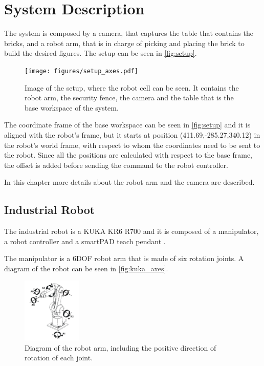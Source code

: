 \chapter{System Description}\label{chap:systemDescription}
The system is composed by a camera, that captures the table that contains the bricks, and a robot arm, that is in charge of picking and placing the brick to build the desired figures. The setup can be seen in \autoref{fig:setup}.
\begin{figure}[H]
    \texttt{[image: figures/setup\_axes.pdf]}
    \caption{Image of the setup, where the robot cell can be seen. It contains the robot arm, the security fence, the camera and the table that is the base workspace of the system. }
    \label{fig:setup}
\end{figure}

The coordinate frame of the base workspace can be seen in \autoref{fig:setup} and it is aligned with the robot's frame, but it starts at position (411.69,-285.27,340.12) in the robot's world frame, with respect to whom the coordinates need to be sent to the robot. Since all the positions are calculated with respect to the base frame, the offset is added before sending the command to the robot controller.
  
In this chapter more details about the robot arm and the camera are described. 

\section{Industrial Robot}
The industrial robot is a KUKA KR6 R700 and it is composed of a manipulator, a robot controller and a smartPAD teach pendant \cite{kuka}. 

The manipulator is a 6DOF robot arm that is made of six rotation joints. A diagram of the robot can be seen in \autoref{fig:kuka_axes}.
\begin{figure}[H]
    \includegraphics[width=0.25\textwidth]{figures/kuka_axes.png}
    \caption{Diagram of the robot arm, including the positive direction of rotation of each joint. \cite{kuka} }
    \label{fig:kuka_axes}
\end{figure}

